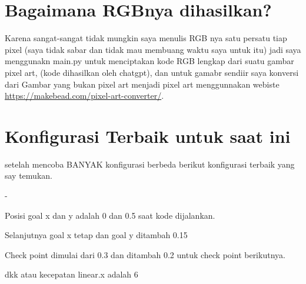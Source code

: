 \documentclass{article}
\begin{document}
\section{Bagaimana RGBnya dihasilkan?}
Karena sangat-sangat tidak mungkin saya menulis RGB nya satu persatu tiap pixel (saya tidak sabar dan tidak mau membuang waktu saya untuk itu) jadi saya menggunakn main.py untuk menciptakan kode RGB lengkap dari suatu gambar pixel art, (kode dihasilkan oleh chatgpt), dan untuk gamabr sendiir saya konversi dari Gambar
yang bukan pixel art menjadi pixel art menggunnakan webiste 
\href{https://makebead.com/pixel-art-converter/}{https://makebead.com/pixel-art-converter/}.
 
\section{Konfigurasi Terbaik untuk saat ini}
setelah mencoba BANYAK konfigurasi berbeda berikut konfigurasi terbaik yang say temukan.
\begin{list}{-}{}
    \item Posisi goal x dan y adalah 0 dan 0.5 saat kode dijalankan.
    \item Selanjutnya goal x tetap dan goal y ditambah 0.15
    \item Check point dimulai dari 0.3 dan ditambah 0.2 untuk check point berikutnya.
    \item dkk atau kecepatan linear.x adalah 6
\end{list}
\end{document}
